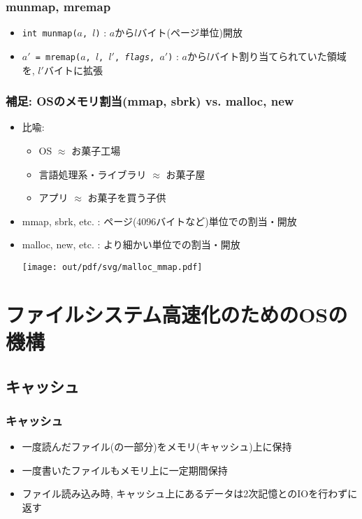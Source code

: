 \documentclass[12pt,dvipdfmx]{beamer}
\begin{document}
\begin{frame}[fragile]
  \frametitle{munmap, mremap}
  \begin{itemize}
  \item {\tt int munmap($a$, $l$)} : $a$から$l$バイト(ページ単位)開放
  \item {\tt $a'$ = mremap($a$, $l$, $l'$, {\it flags}, $a'$)} :
    $a$から$l$バイト割り当てられていた領域を, $l'$バイトに拡張
  \end{itemize}
\end{frame}

\begin{frame}[fragile]
  \frametitle{補足: OSのメモリ割当(mmap, sbrk) vs. malloc, new}
  \begin{itemize}
  \item 比喩:
    \begin{itemize}
    \item OS $\approx$ お菓子工場
    \item 言語処理系・ライブラリ $\approx$ お菓子屋
    \item アプリ $\approx$ お菓子を買う子供
    \end{itemize}
  \item mmap, sbrk, etc. : ページ(4096バイトなど)単位での割当・開放
  \item malloc, new, etc. : より細かい単位での割当・開放

  \begin{center}
    \texttt{[image: out/pdf/svg/malloc\_mmap.pdf]}
  \end{center}
    
  \end{itemize}
\end{frame}


\section{ファイルシステム高速化のためのOSの機構}

\subsection{キャッシュ}

\begin{frame}
  \frametitle{キャッシュ}
  \begin{itemize}
  \item 一度読んだファイル(の一部分)をメモリ(キャッシュ)上に保持
  \item 一度書いたファイルもメモリ上に一定期間保持
  \item ファイル読み込み時,
    キャッシュ上にあるデータは2次記憶とのIOを行わずに返す
  \end{itemize}
\end{frame}
\end{document}
